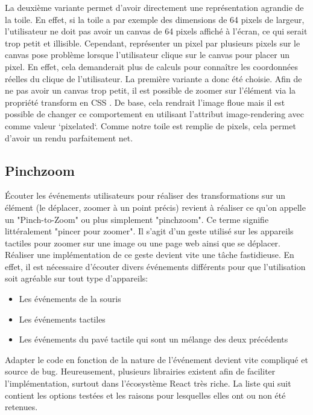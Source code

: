 La deuxième variante permet d'avoir directement une représentation agrandie de la toile. En effet, si la toile a par exemple des dimensions de 64 pixels de largeur, l'utilisateur ne doit pas avoir un canvas de 64 pixels affiché à l'écran, ce qui serait trop petit et illisible. Cependant, représenter un pixel par plusieurs pixels sur le canvas pose problème lorsque l'utilisateur clique sur le canvas pour placer un pixel. En effet, cela demanderait plus de calculs pour connaître les coordonnées réelles du clique de l'utilisateur. La première variante a donc été choisie. Afin de ne pas avoir un canvas trop petit, il est possible de zoomer sur l'élément via la propriété transform en CSS \cite{transformcss}. De base, cela rendrait l'image floue mais il est possible de changer ce comportement en utilisant l'attribut image-rendering \cite{image-renderingcss} avec comme valeur `pixelated`. Comme notre toile est remplie de pixels, cela permet d'avoir un rendu parfaitement net.

\subsection{Pinchzoom}

Écouter les événements utilisateurs pour réaliser des transformations sur un élément (le déplacer, zoomer à un point précis) revient à réaliser ce qu'on appelle un "Pinch-to-Zoom" ou plus simplement "pinchzoom". Ce terme signifie littéralement "pincer pour zoomer". Il s'agit d'un geste utilisé sur les appareils tactiles pour zoomer sur une image ou une page web ainsi que se déplacer. Réaliser une implémentation de ce geste devient vite une tâche fastidieuse. En effet, il est nécessaire d'écouter divers événements différents pour que l'utilisation soit agréable sur tout type d'appareils:

\begin{itemize}
  \item Les événements de la souris
  \item Les événements tactiles
  \item Les événements du pavé tactile qui sont un mélange des deux précédents
\end{itemize}

Adapter le code en fonction de la nature de l'événement devient vite compliqué et source de bug. Heureusement, plusieurs librairies existent afin de faciliter l'implémentation, surtout dans l'écosystème React très riche. La liste qui suit contient les options testées et les raisons pour lesquelles elles ont ou non été retenues.

